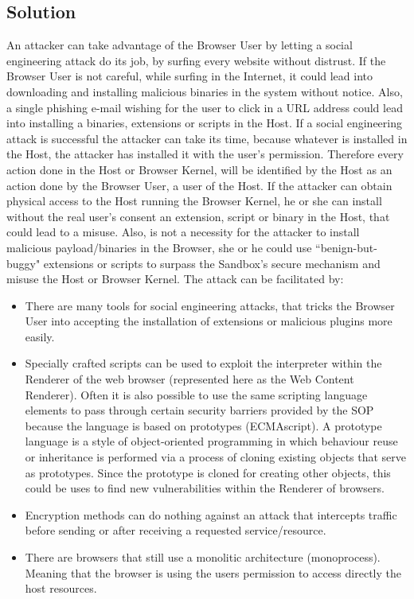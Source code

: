 \documentclass{sig-alternate-05-2015}
\begin{document}
\subsection*{Solution}
An attacker can take advantage of the Browser User by letting a social engineering attack do its job, by surfing every website without distrust. If the Browser User is not careful, while surfing in the Internet, it could lead into downloading and installing malicious binaries in the system without notice. Also, a single phishing e-mail wishing for the user to click in a URL address could lead into installing a binaries, extensions or scripts in the Host. If a social engineering attack is successful the attacker can take its time, because whatever is installed in the Host, the attacker has installed it with the user's permission. Therefore every action done in the Host or Browser Kernel, will be identified by the Host as an action done by the Browser User, a user of the Host. 
If the attacker can obtain physical access to the Host running the Browser Kernel, he or she can install without the real user's consent an extension, script or binary in the Host, that could lead to a misuse. Also, is not a necessity for the attacker to install malicious payload/binaries in the Browser, she or he could use ``benign-but-buggy" extensions or scripts to surpass the Sandbox's secure mechanism and misuse the Host or Browser Kernel. The attack can be facilitated by:
\begin{itemize}
  \item There are many tools for social engineering attacks, that tricks the Browser User into accepting the installation of extensions or malicious plugins more easily.
  \item Specially crafted scripts can be used to exploit the interpreter within the Renderer of the web browser (represented here as the Web Content Renderer). Often it is also possible to use the same scripting language elements to pass through certain security barriers provided by the SOP because the language is based on prototypes (ECMAscript). A prototype language is a style of object-oriented programming in which behaviour reuse or inheritance is performed via a process of cloning existing objects that serve as prototypes. Since the prototype is cloned for creating other objects, this could be uses to find new vulnerabilities within the Renderer of browsers.
  \item Encryption methods can do nothing against an attack that intercepts traffic before sending or after receiving a requested service/resource.
  \item There are browsers that still use a monolitic architecture (monoprocess). Meaning that the browser is using the users permission to access directly the host resources.
\end{itemize}
\end{document}
